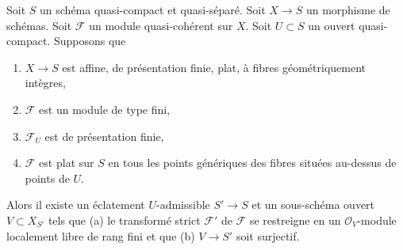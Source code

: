 \begin{lemma}
\label{lemma-flatten-module-pre}
Soit $S$ un schéma quasi-compact et quasi-séparé.\newline
Soit $X \to S$ un morphisme de schémas.
Soit $\mathcal{F}$ un module quasi-cohérent sur $X$.
Soit $U \subset S$ un ouvert quasi-compact. Supposons que
\begin{enumerate}
\item $X \to S$ est affine, de présentation finie, plat, à
fibres géométriquement intègres,
\item $\mathcal{F}$ est un module de type fini,
\item $\mathcal{F}_U$ est de présentation finie,
\item $\mathcal{F}$ est plat sur $S$ en tous les points génériques des
fibres situées au-dessus de points de $U$.
\end{enumerate}
Alors il existe un éclatement $U$-admissible $S' \to S$
et un sous-schéma ouvert $V \subset X_{S'}$
tels que (a) le transformé strict $\mathcal{F}'$ de $\mathcal{F}$
se restreigne en un $\mathcal{O}_V$-module localement libre de rang fini et que
(b) $V \to S'$ soit surjectif.
\end{lemma}

